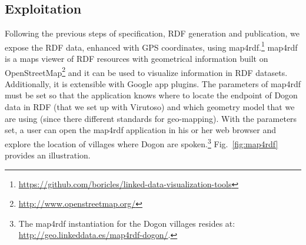 

\subsection{Exploitation}
Following the previous steps of specification, RDF generation and publication, we expose the RDF data, enhanced with GPS coordinates, using map4rdf.\footnote{\url{https://github.com/boricles/linked-data-visualization-tools}} map4rdf is a maps viewer of RDF resources with geometrical information built on OpenStreetMap\footnote{\url{http://www.openstreetmap.org/}} and it can be used to visualize information in RDF datasets. Additionally, it is extensible with Google app plugins. The parameters of map4rdf must be set so that the application knows where to locate the endpoint of Dogon data in RDF (that we set up with Virutoso) and which geometry model that we are using (since there different standards for geo-mapping). With the parameters set, a user can open the map4rdf application in his or her web browser and explore the location of villages where Dogon are spoken.\footnote{The map4rdf instantiation for the Dogon villages resides at: \url{http://geo.linkeddata.es/map4rdf-dogon/}.} Fig.\ \ref{fig:map4rdf} provides an illustration.

